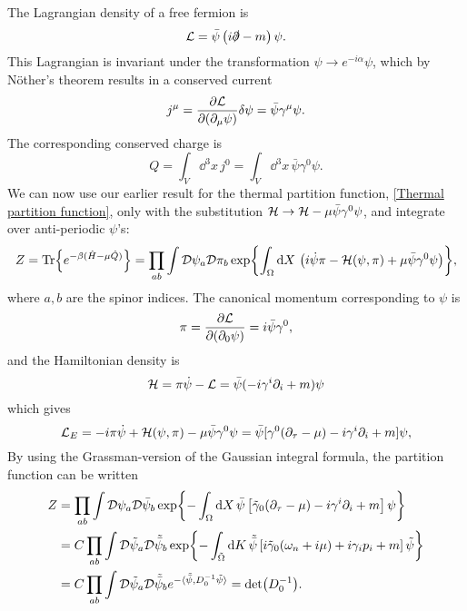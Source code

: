 The Lagrangian density of a free fermion is
\begin{equation}
    \mathcal{L} = \bar \psi \left( i \slashed{\partial} - m \right) \psi.
\end{equation}
This Lagrangian is invariant under the transformation $\psi \rightarrow e^{-i \alpha} \psi$, which by Nöther's theorem results in a conserved current
\begin{equation}
    j^\mu = \pdv{\mathcal{L}}{(\partial_\mu \psi)} \delta \psi=  \bar \psi \gamma^\mu \psi.
\end{equation}
The corresponding conserved charge is 
\begin{equation}
    Q = \int_V \dd^3 x\, j^0 = \int_V \dd^3 x \, \bar \psi \gamma^0 \psi.
\end{equation}
We can now use our earlier result for the thermal partition function, \autoref{Thermal partition function}, only with the substitution $\mathcal{H} \rightarrow \mathcal{H} - \mu \bar \psi \gamma^0 \psi$, and integrate over anti-periodic $\psi$'s:
\begin{equation*}
    Z = \Tr{e^{-\beta(\hat H - \mu \hat Q)}}
    = \prod_{a b}\int \mathcal D \psi_a\mathcal D \pi_b \exp{
        \int_{\Omega} \dd X \, 
        \left(
            i\dot \psi \pi - \mathcal{H}(\psi, \pi) + \mu \bar \psi \gamma^0 \psi
        \right)
    },
\end{equation*}
where $a, b$ are the spinor indices.
The canonical momentum corresponding to $\psi$ is
\begin{equation}
    \pi = \pdv{\mathcal{L}}{(\partial_0 \psi)} = i \bar \psi \gamma^0,
\end{equation}
and the Hamiltonian density is 
\begin{equation}
    \mathcal{H} = \pi \dot\psi - \mathcal{L}
    = \bar \psi (-i\gamma^i\partial_i + m) \psi
\end{equation}
which gives
\begin{equation}
    \mathcal{L}_E = 
    - i \pi \dot\psi + \mathcal{H}(\psi, \pi) - \mu \bar \psi \gamma^0 \psi
    = \bar\psi[\gamma^0 (\partial_\tau - \mu) - i\gamma^i \partial_i + m] \psi,
\end{equation}
By using the Grassman-version of the Gaussian integral formula, the partition function can be written
\begin{align*}
    Z & = \prod_{a b}\int \mathcal D \psi_a\mathcal D \bar \psi_b 
    \exp{
        - \int_\Omega \dd X \, \bar \psi
        \left[
            \tilde\gamma_0(\partial_\tau -\mu) -  i \gamma^i \partial_i + m
        \right]
        \psi
    }\\
    & = C \prod_{a b}\int \mathcal D \tilde \psi_a\mathcal D \tilde {\bar \psi}_b 
    \exp{
        - \int_{\tilde \Omega} \dd K \, \tilde {\bar \psi}
        \left[
            i \tilde\gamma_0(\omega_n + i\mu) + i \gamma_i p_i + m
        \right]
        \tilde \psi
    } \\
    & = C \prod_{a b}\int \mathcal D \tilde \psi_a\mathcal D \tilde {\bar \psi}_b 
    e^{- \langle \tilde {\bar \psi}, D_0^{-1} \tilde \psi\rangle} 
    = \det(D_0^{-1}).
\end{align*}
